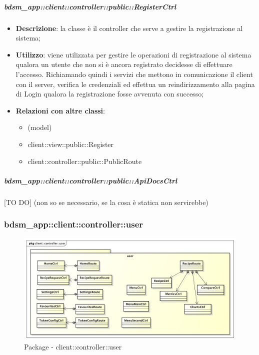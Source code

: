 		\subparagraph{bdsm\_app::client::controller::public::RegisterCtrl} %
		\label{subp:bdsm_app_client_controller_public_registerctrl}
			\begin{itemize}
				\item \textbf{Descrizione}: la classe è il controller che serve a gestire la registrazione al sistema;
				\item \textbf{Utilizzo}: viene utilizzata per gestire le operazioni di registrazione al sistema qualora un utente che non si è ancora registrato decidesse di effettuare l'accesso. Richiamando quindi i servizi che mettono in comunicazione il client con il server, verifica le credenziali ed effettua un reindirizzamento alla pagina di Login qualora la registrazione fosse avvenuta con successo;
				\item \textbf{Relazioni con altre classi}:
					\begin{itemize}
						\item [TO DO] (model)
						\item client::view::public::Register
						\item client::controller::public::PublicRoute
					\end{itemize}
			\end{itemize}

		\subparagraph{bdsm\_app::client::controller::public::ApiDocsCtrl} %
		\label{subp:bdsm_app_client_controller_public_apidocsctrl}
		[TO DO] (non so se necessario, se la cosa è statica non servirebbe)





\subsubsection{bdsm\_app::client::controller::user} %
\label{ssub:bdsm_app_client_controller_user}
\begin{figure}[htbp]
	\centering
	\centerline{\includegraphics[scale=0.45]{./images/client_controller_user.pdf}}
	\caption{Package - client::controller::user}
\end{figure}

